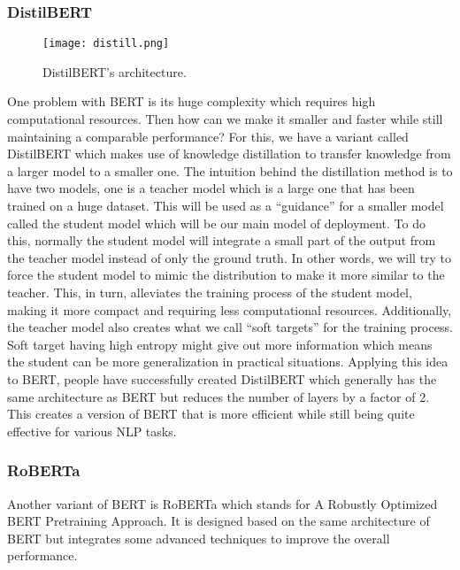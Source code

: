 \documentclass[conference]{IEEEtran}
\begin{document}
\subsubsection{DistilBERT\cite{sanh2020distilbert}} 
\begin{figure}
    \centering
    \texttt{[image: distill.png]}
    \caption{DistilBERT's architecture.}
    \label{fig:enter-label}
\end{figure}
\noindent One problem with BERT is its huge complexity which requires high computational resources.
Then how can we make it smaller and faster while still maintaining a comparable performance? For
this, we have a variant called DistilBERT which makes use of knowledge distillation to transfer
knowledge from a larger model to a smaller one.
\noindent The intuition behind the distillation method is to have two models, one is a teacher model
which is a large one that has been trained on a huge dataset. This will be used as a “guidance” for a
smaller model called the student model which will be our main model of deployment. To do this,
normally the student model will integrate a small part of the output from the teacher model instead
of only the ground truth. In other words, we will try to force the student model to mimic the
distribution to make it more similar to the teacher. This, in turn, alleviates the training process
of the student model, making it more compact and requiring less computational resources.
Additionally, the teacher model also creates what we call “soft targets” for the training process.
Soft target having high entropy might give out more information which means the student can be more
generalization in practical situations.
\noindent Applying this idea to BERT, people have successfully created DistilBERT which generally has
the same architecture as BERT but reduces the number of layers by a factor of 2. This creates a
version of BERT that is more efficient while still being quite effective for various NLP tasks.

\vspace{3mm}
\subsubsection{RoBERTa\cite{liu2019roberta}} 
\noindent Another variant of BERT is RoBERTa which stands for A Robustly Optimized BERT Pretraining
Approach. It is designed based on the same architecture of BERT but integrates some advanced
techniques to improve the overall performance.
\end{document}
